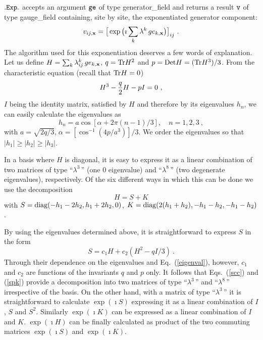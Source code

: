$\tt .Exp.$ accepts an argument $\tt ge$ of type generator\_field
and returns a result $\tt v$ of type gauge\_field containing, site by site, 
the exponentiated generator component:
%
\begin{equation}
v_{ij,{\bf x}} =\big[ \exp \big(\imath \sum_k \lambda^k\, ge_{k,{\bf x}}\big)
\big]_{ij} \ .
\label{exp}
\end{equation}
%
The algorithm used for this exponentiation deserves a few words of explanation.
Let us define $H=\sum_k \lambda^k_{ij}\, ge_{k,{\bf x}}$, $q={\rm Tr} H^2$
and $p={\rm Det} H = ({\rm Tr} H^3)/3$.  From the characteristic
equation (recall that ${\rm Tr} H =0$)
%
\begin{equation}
H^3 - {q \over 2} H - p I =0 \ ,
\label{charact}
\end{equation}
%
$I$ being the identity matrix, satisfied by $H$ and 
therefore by its eigenvalues $h_n$, we can
easily calculate the eigenvalues as
%
\begin{equation}
h_n =a \cos[\alpha + 2 \pi (n-1)/3], \quad n=1,2,3 \ ,
\label{eigenval}
\end{equation}
%
with $a=\sqrt{2 q / 3}$,$\; \alpha = [\cos^{-1}(4 p / a^3)]/3$.  
We order the eigenvalues so that $|h_1| \ge |h_2| \ge |h_3|$.

In a basis where $H$ is diagonal, it is easy to express it as
a linear combination  of two matrices of type ``$\lambda^3\,$'' 
(one 0 eigenvalue) and ``$\lambda^8\,$'' (two degenerate eigenvalues), 
respectively. Of the six different ways in which this can be done 
we use the decomposition
%
\begin{equation}
H = S + K
\label{spk}
\end{equation}
%
with $S = {\rm diag} (-h_1-2 h_2, h_1+2 h_2, 0)$, 
$K = {\rm diag} (2(h_1+ h_2), -h_1-h_2, -h_1-h_2)$.

By using the eigenvalues determined above, it is
straightforward to express $S$ in the form 
%
\begin{equation}
S = c_1 H + c_2 (H^2 - q I /3) \ .
\label{scc}
\end{equation}
%
Through their dependence on the
eigenvalues and Eq.~(\ref{eigenval}), however, $c_1$ and $c_2$ are
functions of the invariants $q$ and $p$ only.  It follows that 
Eqs.~(\ref{scc}) and (\ref{spk}) provide a decomposition into 
two matrices of type ``$\lambda^3\,$'' and ``$\lambda^8\,$'' irrespective
of the basis.  On the other hand, with a matrix
of type ``$\lambda^3\,$'' it is straightforward to calculate
$\exp(\imath S)$ expressing it as a linear combination
of $I$, $S$ and $S^2$.  Similarly $\exp(\imath K)$ can be expressed
as a linear combination of $I$ and $K$. $\exp (\imath H)$ can be
finally calculated as product of the two commuting
matrices $\exp (\imath S)$ and $\exp (\imath K)$.

